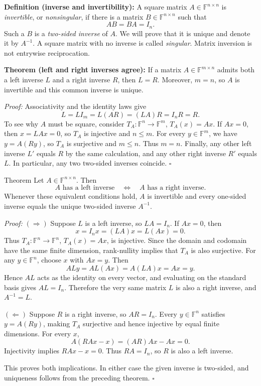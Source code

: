 \documentclass[a4paper,11pt,abstract=true]{scrartcl}
\theoremstyle{dotlessP}
\theoremstyle{dotlessS}
\theoremstyle{remark}
\theoremstyle{definition}
\begin{document}
\begin{definition_box}
\textbf{Definition (inverse and invertibility):} A square matrix
$A\in\mathbb{F}^{n\times n}$ is \emph{invertible}, or
\emph{nonsingular}, if there is a matrix $B\in\mathbb{F}^{n\times n}$
such that
\[
AB=BA=I_n.
\]
Such a $B$ is a \emph{two-sided inverse} of $A$. We will prove that it
is unique and denote it by $A^{-1}$. A square matrix with no inverse is
called \emph{singular}. Matrix inversion is not entrywise reciprocation.
\end{definition_box}

\begin{claim_box}
\textbf{Theorem (left and right inverses agree):} If a matrix
$A\in\mathbb{F}^{m\times n}$ admits both a left inverse $L$ and a
right inverse $R$, then $L=R$. Moreover, $m=n$, so $A$ is invertible
and this common inverse is unique.

\textit{Proof:} Associativity and the identity laws give
\[
L=L I_m=L(AR)=(LA)R=I_n R=R.
\]
To see why $A$ must be square, consider
$T_A:\mathbb{F}^n\longrightarrow\mathbb{F}^m$, $T_A(x)=Ax$.
If $Ax=0$, then $x=LAx=0$, so $T_A$ is injective and $n\leq m$.
For every $y\in\mathbb{F}^m$, we have $y=A(Ry)$, so $T_A$ is
surjective and $m\leq n$. Thus $m=n$.
Finally, any other left inverse $L'$ equals $R$ by the same calculation,
and any other right inverse $R'$ equals $L$. In particular, any two
two-sided inverses coincide. \hfill$\square$
\end{claim_box}

\begin{mainbox}{Theorem}
Let
$A\in\mathbb{F}^{n\times n}$. Then
\[
A\text{ has a left inverse}
\quad\Longleftrightarrow\quad
A\text{ has a right inverse}.
\]
Whenever these equivalent conditions hold, $A$ is invertible and
every one-sided inverse equals the unique two-sided inverse $A^{-1}$.
\end{mainbox}

\begin{claim_box}
\textit{Proof:} $(\Rightarrow)$ Suppose $L$ is a left inverse,
so $LA=I_n$.
If $Ax=0$, then
\[
x=I_n x=(LA)x=L(Ax)=0.
\]
Thus $T_A:\mathbb{F}^n\longrightarrow\mathbb{F}^n$, $T_A(x)=Ax$,
is injective. Since the domain and codomain have the same finite
dimension, rank-nullity implies that $T_A$ is also surjective.
For any $y\in\mathbb{F}^n$, choose $x$ with $Ax=y$. Then
\[
ALy=AL(Ax)=A(LA)x=Ax=y.
\]
Hence $AL$ acts as the identity on every vector, and evaluating on
the standard basis gives $AL=I_n$. Therefore the very same matrix $L$
is also a right inverse, and $A^{-1}=L$.

$(\Leftarrow)$ Suppose $R$ is a right inverse, so $AR=I_n$. Every
$y\in\mathbb{F}^n$ satisfies $y=A(Ry)$, making $T_A$ surjective
and hence injective by equal finite dimensions. For every $x$,
\[
A(RAx-x)=(AR)Ax-Ax=0.
\]
Injectivity implies $RAx-x=0$. Thus $RA=I_n$, so $R$ is also a
left inverse.

This proves both implications. In either case the given inverse is
two-sided, and uniqueness follows from the preceding theorem.
\hfill$\square$
\end{claim_box}
\end{document}
